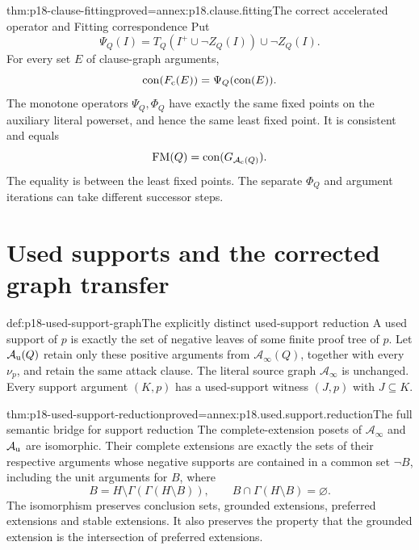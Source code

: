 \begin{hbtheorem}{thm:p18-clause-fitting}{proved=annex:p18.clause.fitting}{The correct accelerated operator and Fitting correspondence}
Put
\[
 \Psi_Q(I)=T_Q(I^+\cup\neg Z_Q(I))\cup\neg Z_Q(I).
\]
For every set \(E\) of clause-graph arguments,
\[
          \operatorname{con}(F_{\rm c}(E))
                         =\Psi_Q(\operatorname{con}(E)).
\]
The monotone operators \(\Psi_Q,\Phi_Q\) have
exactly the same fixed points on the auxiliary
literal powerset, and hence the same least
fixed point. It is consistent and equals
\[
       \operatorname{FM}(Q)
                         =\operatorname{con}(G_{\mathcal A_{\rm c}(Q)}).
\]
The equality is between the least fixed points.
The separate \(\Phi_Q\) and argument iterations
can take different successor steps.
\end{hbtheorem}

\section{Used supports and the corrected graph transfer}

\begin{hbdefinition}{def:p18-used-support-graph}{The explicitly distinct used-support reduction}
A used support of \(p\) is exactly the set
of negative leaves of some finite proof tree
of \(p\). Let \(\mathcal A_{\rm u}(Q)\)
retain only these positive arguments from
\(\mathcal A_\infty(Q)\), together with every
\(\nu_p\), and retain the same attack clause.
The literal source graph \(\mathcal A_\infty\)
is unchanged. Every support argument \((K,p)\)
has a used-support witness \((J,p)\) with \(J\subseteq K\).
\end{hbdefinition}

\begin{hbtheorem}{thm:p18-used-support-reduction}{proved=annex:p18.used.support.reduction}{The full semantic bridge for support reduction}
The complete-extension posets of
\(\mathcal A_\infty\) and \(\mathcal A_{\rm u}\)
are isomorphic. Their complete extensions
are exactly the sets of their respective
arguments whose negative supports are
contained in a common set \(\neg B\),
including the unit arguments for \(B\),
where
\[
 B=H\setminus\Gamma(\Gamma(H\setminus B)),
                  \qquad B\cap\Gamma(H\setminus B)=\varnothing.
\]
The isomorphism preserves conclusion sets,
grounded extensions, preferred extensions
and stable extensions. It also preserves
the property that the grounded extension
is the intersection of preferred extensions.
\end{hbtheorem}

